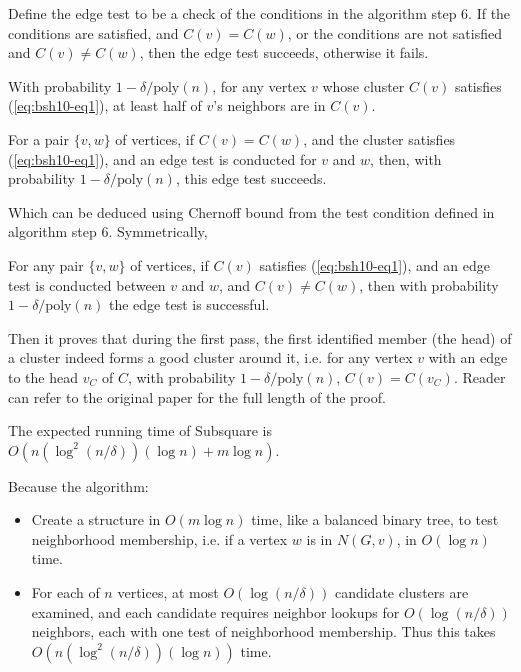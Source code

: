 {	Define the edge test to be a check of the conditions in the algorithm step 6. If the conditions are satisfied, and $C(v)=C(w)$, or the conditions are not satisfied and $C(v) \neq C(w)$, then the edge test succeeds, otherwise it fails.
	
	\begin{lemma}
		With probability $1-\delta/\mathrm{poly}(n)$, for any vertex $v$ whose cluster $C(v)$ satisfies (\ref{eq:bsh10-eq1}), at least half of $v$’s neighbors are in $C(v)$.
	\end{lemma}
	
	\begin{lemma}
		For a pair $\{ v, w \}$ of vertices, if $C(v) = C(w)$, and the cluster satisfies (\ref{eq:bsh10-eq1}), and an edge test is conducted for $v$ and $w$, then, with probability $1-\delta/\mathrm{poly}(n)$, this edge test succeeds.
	\end{lemma}
	
	Which can be deduced using Chernoff bound from the test condition defined in algorithm step 6. Symmetrically,
	
	\begin{lemma}
		For any pair $\{ v, w \}$ of vertices, if $C(v)$ satisfies (\ref{eq:bsh10-eq1}), and an edge test is conducted between $v$ and $w$, and $C(v) \neq C(w)$, then with probability $1-\delta/\mathrm{poly}(n)$ the edge test is successful.
	\end{lemma}
	
	Then it proves that during the first pass, the first identified member (the head) of a cluster indeed forms a good cluster around it, i.e. for any vertex $v$ with an edge to the head $v_C$ of $C$, with probability $1-\delta/\mathrm{poly}(n)$, $C(v) = C(v_C)$. Reader can refer to the original paper for the full length of the proof.
	
	\begin{theorem}
		The expected running time of Subsquare is $O(n(\log ^{2}(n / \delta))(\log n)+m \log n)$.
	\end{theorem}
	
	Because the algorithm:
	
	\begin{itemize}
		\item Create a structure in $O(m \log n)$ time, like a balanced binary tree, to test neighborhood membership, i.e. if a vertex $w$ is in $N(G,v)$, in $O(\log n)$ time.
		\item For each of $n$ vertices, at most $O(\log(n/\delta))$ candidate clusters are examined, and each candidate requires neighbor lookups for $O(\log(n/\delta))$ neighbors, each with one test of neighborhood membership. Thus this takes $O(n(\log ^{2}(n / \delta))(\log n))$ time.
	\end{itemize}
	
}
